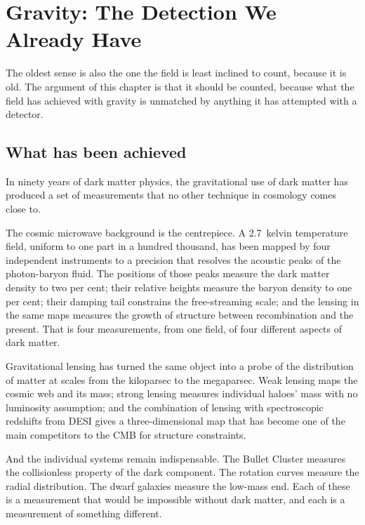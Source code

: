 
\chapter{Gravity: The Detection We Already Have}
\label{ch:gravity}

The oldest sense is also the one the field is least inclined to count, because
it is old. The argument of this chapter is that it should be counted, because
what the field has achieved with gravity is unmatched by anything it has
attempted with a detector.

\section{What has been achieved}In ninety years of dark matter physics, the
gravitational use of dark matter has produced a set of measurements that no
other technique in cosmology comes close to.

The cosmic microwave background is the centrepiece. A 2.7~kelvin
temperature field, uniform to one part in a hundred thousand, has been mapped
by four independent instruments to a precision that resolves the acoustic
peaks of the photon-baryon fluid. The positions of those peaks measure the
dark matter density to two per cent; their relative heights measure the baryon
density to one per cent; their damping tail constrains the free-streaming
scale; and the lensing in the same maps measures the growth of structure
between recombination and the present. That is four measurements, from one
field, of four different aspects of dark matter.

Gravitational lensing has turned the same object into a probe of the
distribution of matter at scales from the kiloparsec to the megaparsec.
Weak lensing maps the cosmic web and its mass; strong lensing measures
individual haloes' mass with no luminosity assumption; and the combination of
lensing with spectroscopic redshifts from DESI gives a three-dimensional map
that has become one of the main competitors to the CMB for structure
constraints.

And the individual systems remain indispensable. The Bullet Cluster measures
the collisionless property of the dark component. The rotation curves measure
the radial distribution. The dwarf galaxies measure the low-mass end. Each
of these is a measurement that would be impossible without dark matter, and
each is a measurement of something different.

